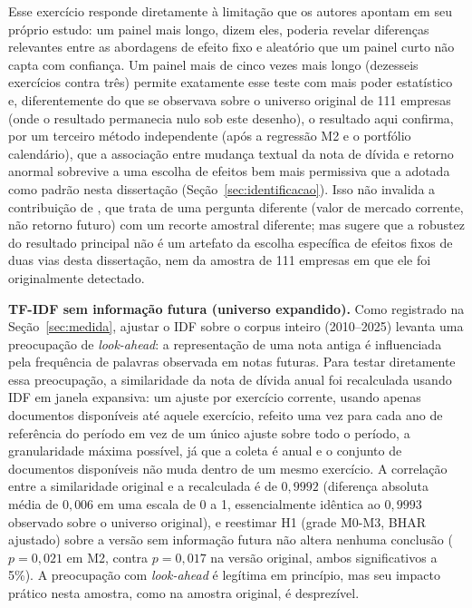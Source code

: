 \documentclass[a4paper,12pt]{report}
\begin{document}
Esse exercício responde diretamente à limitação que os autores apontam em seu próprio estudo: um painel mais longo, dizem eles, poderia revelar diferenças relevantes entre as abordagens de efeito fixo e aleatório que um painel curto não capta com confiança. Um painel mais de cinco vezes mais longo (dezesseis exercícios contra três) permite exatamente esse teste com mais poder estatístico e, diferentemente do que se observava sobre o universo original de 111 empresas (onde o resultado permanecia nulo sob este desenho), o resultado aqui confirma, por um terceiro método independente (após a regressão M2 e o portfólio calendário), que a associação entre mudança textual da nota de dívida e retorno anormal sobrevive a uma escolha de efeitos bem mais permissiva que a adotada como padrão nesta dissertação (Seção~\ref{sec:identificacao}). Isso não invalida a contribuição de , que trata de uma pergunta diferente (valor de mercado corrente, não retorno futuro) com um recorte amostral diferente; mas sugere que a robustez do resultado principal não é um artefato da escolha específica de efeitos fixos de duas vias desta dissertação, nem da amostra de 111 empresas em que ele foi originalmente detectado.

\textbf{TF-IDF sem informação futura (universo expandido).} Como registrado na Seção~\ref{sec:medida}, ajustar o IDF sobre o corpus inteiro (2010--2025) levanta uma preocupação de \textit{look-ahead}: a representação de uma nota antiga é influenciada pela frequência de palavras observada em notas futuras. Para testar diretamente essa preocupação, a similaridade da nota de dívida anual foi recalculada usando IDF em janela expansiva: um ajuste por exercício corrente, usando apenas documentos disponíveis até aquele exercício, refeito uma vez para cada ano de referência do período em vez de um único ajuste sobre todo o período, a granularidade máxima possível, já que a coleta é anual e o conjunto de documentos disponíveis não muda dentro de um mesmo exercício. A correlação entre a similaridade original e a recalculada é de $0{,}9992$ (diferença absoluta média de $0{,}006$ em uma escala de 0 a 1, essencialmente idêntica ao $0{,}9993$ observado sobre o universo original), e reestimar H1 (grade M0-M3, BHAR ajustado) sobre a versão sem informação futura não altera nenhuma conclusão ($p=0{,}021$ em M2, contra $p=0{,}017$ na versão original, ambos significativos a 5\%). A preocupação com \textit{look-ahead} é legítima em princípio, mas seu impacto prático nesta amostra, como na amostra original, é desprezível.
\end{document}
